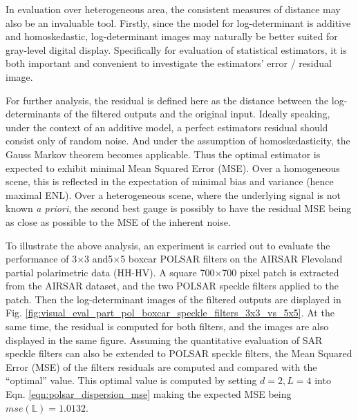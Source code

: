 \documentclass[journal]{IEEEtran}
\begin{document}
In evaluation over heterogeneous area, the consistent measures of distance may also be an invaluable tool.
Firstly, since the model for log-determinant is additive and homoskedastic,
  log-determinant images may naturally be better suited for gray-level digital display.
Specifically for evaluation of statistical estimators, it is both important and convenient to investigate the estimators' error / residual image. %

For further analysis, the residual is defined here as the distance between the log-determinants of the filtered outputs and the original input. 
Ideally speaking, under the context of an additive model,
  a perfect estimators residual should consist only of random noise.
And under the assumption of homoskedasticity, 
  the Gauss Markov theorem becomes applicable.
Thus the optimal estimator is expected to exhibit minimal Mean Squared Error (MSE).
Over a homogeneous scene, this is reflected in the expectation of minimal bias and variance (hence maximal ENL).
Over a heterogeneous scene, where the underlying signal is not known \textit{a priori},
  the second best gauge is possibly to have the residual MSE being as close as possible to the MSE of the inherent noise.
  
To illustrate the above analysis, an experiment is carried out to evaluate the performance of 3$\times$3 and5$\times$5 boxcar POLSAR filters on the AIRSAR Flevoland partial polarimetric data (HH-HV).
A square 700$\times$700 pixel patch is extracted from the AIRSAR dataset,
  and the two POLSAR speckle filters applied to the patch.
Then the log-determinant images of the filtered outputs are displayed in Fig. \ref{fig:visual_eval_part_pol_boxcar_speckle_filters_3x3_vs_5x5}.
At the same time, the residual is computed for both filters, and the images are also displayed in the same figure.
Assuming the quantitative evaluation of SAR speckle filters can also be extended to POLSAR speckle filters,
  the Mean Squared Error (MSE) of the filters residuals are computed and compared with the ``optimal'' value.
This optimal value is computed   
by setting $d=2,L=4$ into Eqn. \ref{eqn:polsar_dispersion_mse} making the expected MSE being $mse(\mathbb{L})=1.0132$.
\end{document}
